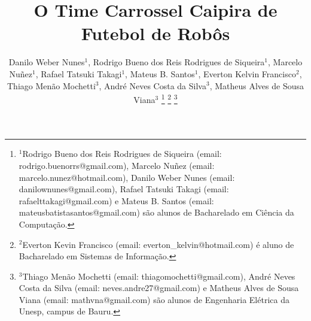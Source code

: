 \title{\LARGE \bf
O Time Carrossel Caipira de Futebol de Robôs
}

\author{{\centering Danilo Weber Nunes$^{1}$, Rodrigo Bueno dos Reis Rodrigues de Siqueira$^{1}$, Marcelo Nu{\~n}ez$^{1}$, Rafael Tatsuki Takagi$^{1}$,}%
{\authorblockN \centering Mateus B. Santos$^{1}$, Everton Kelvin Francisco$^{2}$, Thiago Menão Mochetti$^{3}$, André Neves Costa da Silva$^{3}$,}%
{\authorblockN \centering Matheus Alves de Sousa Viana$^{3}$}%
%
\thanks{$^{1}$Rodrigo Bueno dos Reis Rodrigues de Siqueira (email: rodrigo.buenorrs@gmail.com),
Marcelo Nuñez (email: marcelo.nunez@hotmail.com), Danilo Weber Nunes (email: danilownunes@gmail.com), Rafael Tatsuki Takagi (email: rafaelttakagi@gmail.com) e Mateus B. Santos (email: mateusbatistasantos@gmail.com) são alunos de Bacharelado em Ciência da Computação.}
\thanks{$^{2}$Everton Kevin Francisco (email: everton\_kelvin@hotmail.com) é aluno de Bacharelado em Sistemas de Informação.}
\thanks{$^{3}$Thiago Menão Mochetti (email: thiagomochetti@gmail.com), André Neves Costa da Silva (email: neves.andre27@gmail.com) e Matheus Alves de Sousa Viana (email: mathvna@gmail.com) são alunos de Engenharia Elétrica da Unesp, campus de Bauru.}
}

